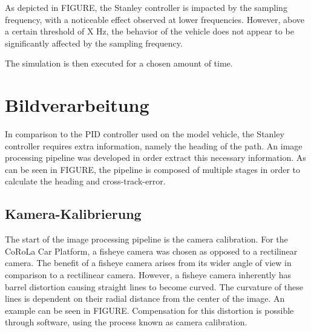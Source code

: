 \documentclass[arbeit=studie,oneside,BCOR=12mm]{ArbeitRST}
\begin{document}
As depicted in FIGURE, the Stanley controller is impacted by the sampling
frequency, with a noticeable effect observed at lower frequencies. However,
above a certain threshold of X Hz, the behavior of the vehicle does not appear
to be significantly affected by the sampling frequency.

The simulation is then executed for a chosen amount of time. 

\chapter{Bildverarbeitung} 

In comparison to the PID controller used on the model vehicle, the Stanley controller requires extra information, namely the heading of the path. An image processing pipeline was developed in order extract this necessary information. As can be seen in FIGURE, the pipeline is composed of multiple stages in order to calculate the heading and cross-track-error. 


\section{Kamera-Kalibrierung} 

The start of the image processing pipeline is the camera calibration. For the
CoRoLa Car Platform, a fisheye camera was chosen as opposed to a rectilinear
camera. The benefit of a fisheye camera arises from its wider angle of view in
comparison to a rectilinear camera. However, a fisheye camera inherently has
barrel distortion causing straight lines to become curved. The curvature of
these lines is dependent on their radial distance from the center of
the image. An example can be seen in FIGURE. Compensation for this distortion
is possible through software, using the process known as camera calibration. 
\end{document}
